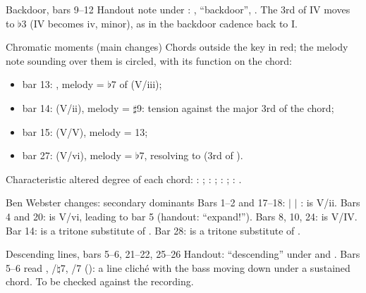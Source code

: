 \begin{study}{Backdoor, bars 9--12}
Handout note under : , ``backdoor'', .
The 3rd of IV moves to $\flat$3 (IV becomes iv, minor), as in the
backdoor cadence back to I.
\end{study}

\begin{study}{Chromatic moments (main changes)}
Chords outside the key in \textcolor{chromatic}{red}; the melody note sounding
over them is circled, with its function on the chord:
\begin{itemize}\setlength{\itemsep}{0pt}
\item bar 13:  , melody  = $\flat$7 of  (V/iii);
\item bar 14:  (V/ii), melody  = $\sharp$9: tension against the major 3rd  of the chord;
\item bar 15:  (V/V), melody  = 13;
\item bar 27:  (V/vi), melody  = $\flat$7, resolving to  (3rd of ).
\end{itemize}
Characteristic altered degree of each chord: : ;
: ; : ; : .
\end{study}

\begin{study}{Ben Webster changes: secondary dominants}
Bars 1--2 and 17--18:   $|$   $|$  :
 is V/ii. Bars 4 and 20:  is V/vi, leading to bar 5 (handout: ``expand!'').
Bars 8, 10, 24:  is V/IV. Bar 14:  is a tritone substitute of .
Bar 28:  is a tritone substitute of .
\end{study}

\begin{study}{Descending lines, bars 5--6, 21--22, 25--26}
Handout: ``descending'' under  and . Bars 5--6 read
, /$\natural$7, /7 (): a line cliché with the bass moving down
under a sustained  chord. To be checked against the recording.
\end{study}
